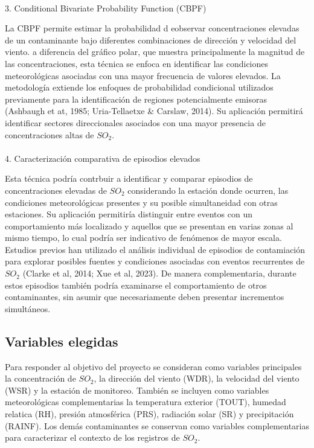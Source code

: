 \documentclass[
  letterpaper,
  DIV=11,
  numbers=noendperiod]{scrartcl}
\makeatletter
\let\oldparagraph\paragraph
\renewcommand{\paragraph}{
    \@ifstar
      \xxxParagraphStar
      \xxxParagraphNoStar
  }
\newcommand{\xxxParagraphStar}[1]{\oldparagraph*{#1}\mbox{}}
\newcommand{\xxxParagraphNoStar}[1]{\oldparagraph{#1}\mbox{}}
\makeatother
\begin{document}
\paragraph{3. Conditional Bivariate Probability Function
(CBPF)}\label{conditional-bivariate-probability-function-cbpf}

La CBPF permite estimar la probabilidad d eobservar concentraciones
elevadas de un contaminante bajo diferentes combinaciones de dirección y
velocidad del viento. a diferencia del gráfico polar, que muestra
principalmente la magnitud de las concentraciones, esta técnica se
enfoca en identificar las condiciones meteorológicas asociadas con una
mayor frecuencia de valores elevados. La metodología extiende los
enfoques de probabilidad condicional utilizados previamente para la
identificación de regiones potencialmente emisoras (Ashbaugh et at,
1985; Uria-Tellaetxe \& Carslaw, 2014). Su aplicación permitirá
identificar sectores direccionales asociados con una mayor presencia de
concentraciones altas de \(SO_2\).

\paragraph{4. Caracterización comparativa de episodios
elevados}\label{caracterizaciuxf3n-comparativa-de-episodios-elevados}

Esta técnica podría contrbuir a identificar y comparar episodios de
concentraciones elevadas de \(SO_2\) considerando la estación donde
ocurren, las condiciones meteorológicas presentes y su posible
simultaneidad con otras estaciones. Su aplicación permitiría distinguir
entre eventos con un comportamiento más localizado y aquellos que se
presentan en varias zonas al mismo tiempo, lo cual podría ser indicativo
de fenómenos de mayor escala. Estudios previos han utilizado el análisis
individual de episodios de contamiación para explorar posibles fuentes y
condiciones asociadas con eventos recurrentes de \(SO_2\) (Clarke et al,
2014; Xue et al, 2023). De manera complementaria, durante estos
episodios también podría examinarse el comportamiento de otros
contaminantes, sin asumir que necesariamente deben presentar incrementos
simultáneos.

\subsection{Variables elegidas}\label{variables-elegidas}

Para responder al objetivo del proyecto se consideran como variables
principales la concentración de \(SO_2\), la dirección del viento (WDR),
la velocidad del viento (WSR) y la estación de monitoreo. También se
incluyen como variables meteorológicas complementarias la temperatura
exterior (TOUT), humedad relatica (RH), presión atmosférica (PRS),
radiación solar (SR) y precipitación (RAINF). Los demás contaminantes se
conservan como variables complementarias para caracterizar el contexto
de los registros de \(SO_2\).
\end{document}
